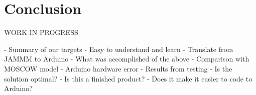\section{Conclusion}
WORK IN PROGRESS

- Summary of our targets
 - Easy to understand and learn
 - Translate from JAMMM to Arduino
- What was accomplished of the above
 - Comparison with MOSCOW model
 - Arduino hardware error
 - Results from testing
 - Is the solution optimal?
 - Is this a finished product?
 - Does it make it easier to code to Arduino?